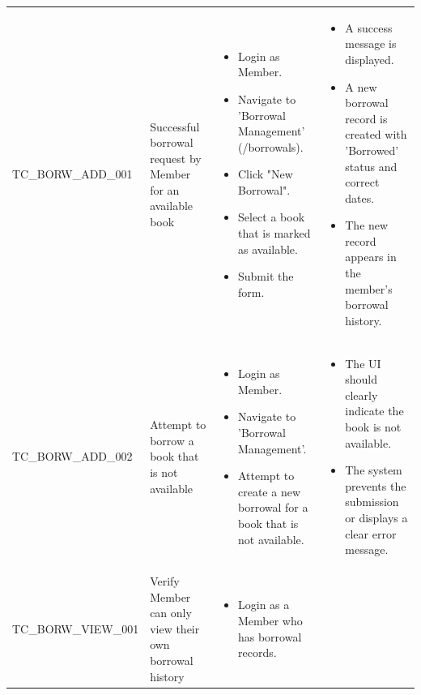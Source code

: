 \begin{longtable}{|>{\scriptsize\raggedright\arraybackslash}p{3.8cm}|>{\raggedright\arraybackslash}p{3.8cm}|>{\raggedright\arraybackslash}p{4cm}|>{\raggedright\arraybackslash}p{4cm}|}
\multicolumn{4}{|l|}{\textbf{Sub-Section: Borrowal Management}} \\ \hline
TC\_BORW\_ADD\_001 & Successful borrowal request by Member for an available book &
    \begin{itemize}[noitemsep, topsep=0pt, partopsep=0pt, leftmargin=*]
        \item Login as Member.
        \item Navigate to 'Borrowal Management' (/borrowals).
        \item Click "New Borrowal".
        \item Select a book that is marked as available.
        \item Submit the form.
    \end{itemize} &
    \begin{itemize}[noitemsep, topsep=0pt, partopsep=0pt, leftmargin=*]
        \item A success message is displayed.
        \item A new borrowal record is created with 'Borrowed' status and correct dates.
        \item The new record appears in the member's borrowal history.
    \end{itemize} \\ \hline
TC\_BORW\_ADD\_002 & Attempt to borrow a book that is not available &
    \begin{itemize}[noitemsep, topsep=0pt, partopsep=0pt, leftmargin=*]
        \item Login as Member.
        \item Navigate to 'Borrowal Management'.
        \item Attempt to create a new borrowal for a book that is not available.
    \end{itemize} &
    \begin{itemize}[noitemsep, topsep=0pt, partopsep=0pt, leftmargin=*]
        \item The UI should clearly indicate the book is not available.
        \item The system prevents the submission or displays a clear error message.
    \end{itemize} \\ \hline
TC\_BORW\_VIEW\_001 & Verify Member can only view their own borrowal history &
    \begin{itemize}[noitemsep, topsep=0pt, partopsep=0pt, leftmargin=*]
        \item Login as a Member who has borrowal records.

\end{itemize}
\end{longtable}
